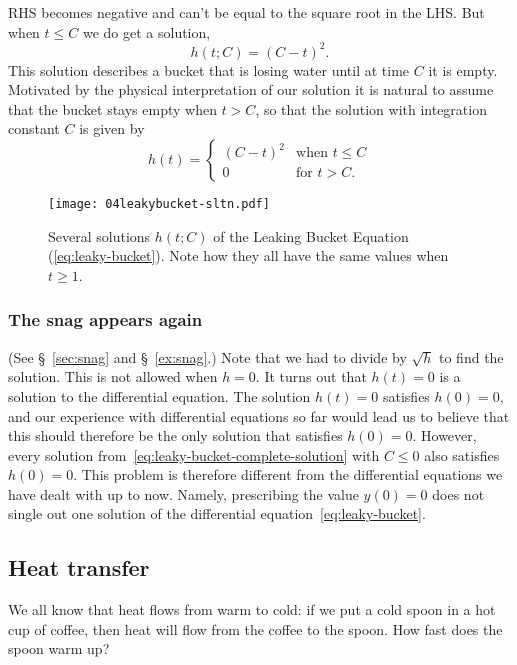 RHS becomes negative and can't be equal to the square root in the LHS. But when
$t\leq C$ we do get a solution,
\[
h (t;C) = (C-t)^2.
\]
This solution describes a bucket that is losing water until at time $C$ it is
empty. Motivated by the physical interpretation of our solution it is natural to
assume that the bucket stays empty when $t>C$, so that the solution with integration
constant $C$ is given by
\begin{equation}
  h(t) =
  \begin{cases}
    (C-t)^2 & \text{when }  t\leq C \\
    0 & \text{for } t>C.
  \end{cases}
  \label{eq:leaky-bucket-complete-solution}
\end{equation}
\begin{figure}
  \texttt{[image: 04leakybucket-sltn.pdf]}
  \caption{Several solutions $h (t; C)$ of the Leaking Bucket Equation
    (\ref{eq:leaky-bucket}).  Note how they all have the same values when $t\ge 1$.}
\end{figure}

\subsubsection*{The snag appears again} (See \S~\ref{sec:snag} and \S~\ref{ex:snag}.)
Note that we had to divide by $\sqrt{h}$ to find the solution.  This is not allowed
when $h=0$.  It turns out that $h(t) = 0$ is a solution to the differential equation.
The solution $h(t)=0$ satisfies $h(0)=0$, and our experience with differential
equations so far would lead us to believe that this should therefore be the only
solution that satisfies $h(0)=0$.  However, every solution
from~\eqref{eq:leaky-bucket-complete-solution} with $C\leq 0$ also satisfies
$h(0)=0$.  This problem is therefore different from the differential equations we
have dealt with up to now.  Namely, prescribing the value $y(0) = 0$ does not single
out one solution of the differential equation~\eqref{eq:leaky-bucket}.


 
\subsection{Heat transfer} %
\label{sec:diffeqs-heat-transfer}
We all know that heat flows from warm to cold: if we put a cold spoon in a hot cup of
coffee, then heat will flow from the coffee to the spoon.  How fast does the spoon
warm up?

